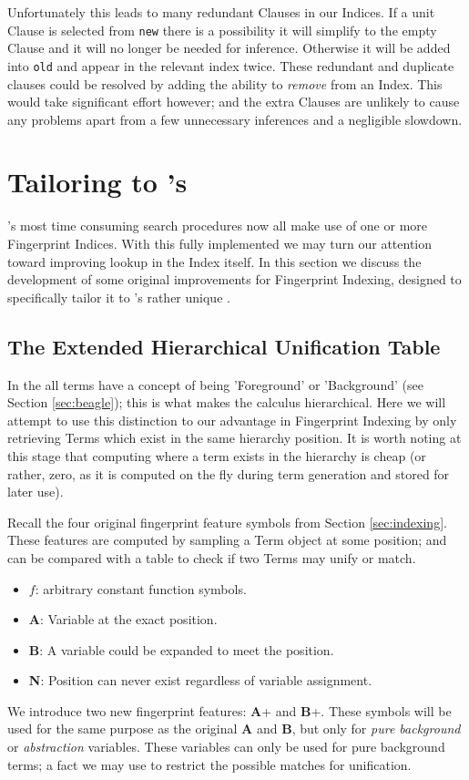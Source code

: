 Unfortunately this leads to many redundant Clauses in our Indices. If a unit Clause
is selected from \verb!new! there is a possibility it will simplify to the empty
Clause and it will no longer be needed for inference. Otherwise it will be added
into \verb!old! and appear in the relevant index twice. These redundant and 
duplicate clauses could be resolved by adding the ability to \emph{remove} from
an Index. This would take significant effort however; and the extra Clauses are
unlikely to cause any problems apart from a few unnecessary inferences and a negligible slowdown. 

\section{Tailoring to \Beagle's \HSWAC}
\label{sec:tailored}

\Beagle's most time consuming search procedures now all make use of one or more
Fingerprint Indices. With this fully implemented we may turn our attention
toward improving lookup in the Index itself.
In this section we discuss the development of some original improvements for Fingerprint Indexing,
designed to specifically tailor it to \beagle's
rather unique \HSWAC.

\subsection{The Extended Hierarchical Unification Table}
\label{sec:extunif}

In the {\HSWAC} all terms have 
a concept of being 'Foreground' or 'Background' (see Section \ref{sec:beagle});
this is what makes the calculus hierarchical. 
Here we will attempt to use this distinction to our advantage in Fingerprint Indexing
by only retrieving Terms which exist in the same hierarchy position. It is
worth noting at this stage that computing where a term exists in the hierarchy is cheap (or rather,
zero, as it is computed on the fly during term generation and stored for later use).

Recall the four original fingerprint feature symbols from Section \ref{sec:indexing}.
These features are computed by sampling a Term object at some position; and can be compared
with a table to check if two Terms may unify or match.
\begin{itemize}
\item $f$: arbitrary constant function symbols.
\item \textbf{A}: Variable at the exact position.
\item \textbf{B}: A variable could be expanded to meet the position.
\item \textbf{N}: Position can never exist regardless of variable assignment.
\end{itemize}
We introduce two new fingerprint features: \textbf{A}+ and \textbf{B}+.
These symbols will be used for the same purpose as the original \textbf{A} and \textbf{B}, but
only for \emph{pure background} or \emph{abstraction} variables. These variables
can only be used for pure background terms; a fact we may use to restrict the possible
matches for unification.


